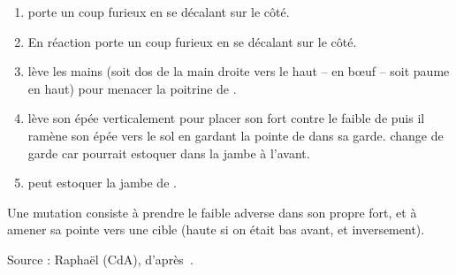 \begin{exercice}[Mutation]

\begin{enumerate}
	\item \A porte un coup furieux en se décalant sur le côté.
	
	\item En réaction \D porte un coup furieux en se décalant sur le côté.
	
	\item \D lève les mains (soit dos de la main droite vers le haut – en bœuf – soit paume en haut) pour menacer la poitrine de \A.
	
	\item \A lève son épée verticalement pour placer son fort contre le faible de \D puis il ramène son épée vers le sol en gardant la pointe de \D dans sa garde. \A change de garde car \D pourrait estoquer dans la jambe à l'avant.
	
	\item \A peut estoquer la jambe de \D.
\end{enumerate}

Une mutation consiste à prendre le faible adverse dans son propre fort, et à amener sa pointe vers une cible (haute si on était bas avant, et inversement).

Source : Raphaël (CdA), d'après~\cite{farrell:ringeck}.
\end{exercice}

